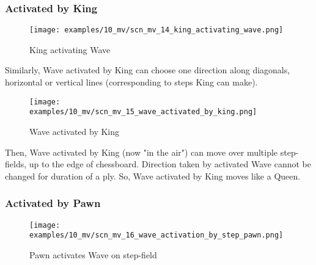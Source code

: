 \subsubsection*{Activated by King}
\label{sec:Miranda's veil/Wave/Movement/Activated by King}

\vspace*{-1.4\baselineskip}
\noindent
\begin{figure}[h]
\texttt{[image: examples/10\_mv/scn\_mv\_14\_king\_activating\_wave.png]}
\caption{King activating Wave}
\label{fig:scn_mv_14_king_activating_wave}
\end{figure}

Similarly, Wave activated by King can choose one direction along diagonals, horizontal
or vertical lines (corresponding to steps King can make).

\clearpage %

\vspace*{-2.1\baselineskip}
\noindent
\begin{figure}[!h]
\texttt{[image: examples/10\_mv/scn\_mv\_15\_wave\_activated\_by\_king.png]}
\caption{Wave activated by King}
\label{fig:scn_mv_15_wave_activated_by_king}
\end{figure}

Then, Wave activated by King (now "in the air") can move over multiple step-fields,
up to the edge of chessboard. Direction taken by activated Wave cannot be changed
for duration of a ply. So, Wave activated by King moves like a Queen.

\clearpage %

\subsubsection*{Activated by Pawn}
\label{sec:Miranda's veil/Wave/Movement/Activated by Pawn}

\vspace*{-1.5\baselineskip}
\noindent
\begin{figure}[!h]
\texttt{[image: examples/10\_mv/scn\_mv\_16\_wave\_activation\_by\_step\_pawn.png]}
\vspace*{-1.3\baselineskip}
\caption{Pawn activates Wave on step-field}
\label{fig:scn_mv_16_wave_activation_by_step_pawn}
\end{figure}

